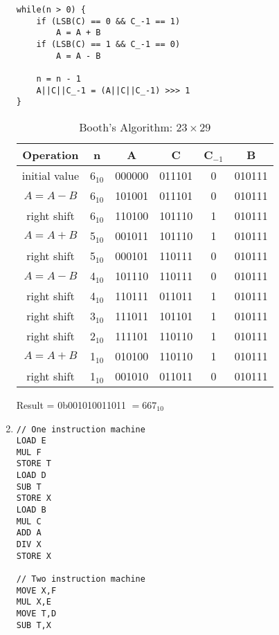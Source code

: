 \documentclass{article}
\begin{document}
\begin{enumerate}
\begin{verbatim}
while(n > 0) {
    if (LSB(C) == 0 && C_-1 == 1)
        A = A + B
    if (LSB(C) == 1 && C_-1 == 0)
        A = A - B
    
    n = n - 1
    A||C||C_-1 = (A||C||C_-1) >>> 1 
}
    \end{verbatim}
    \begin{table}[htbp]
        \centering
        \caption{Booth's Algorithm: \(23 \times 29\)}
        \begin{tabular}{c|c|c|c|c|c}
            \hline
            Operation & n & A & C & C\(_{-1}\) & B \\
            \hline
            initial value & 6\(_{10}\) & 000000 & 011101 & 0 & 010111 \\
            \(A = A - B\) & 6\(_{10}\) & 101001 & 011101 & 0 & 010111 \\
            right shift & 6\(_{10}\) & 110100 & 101110 & 1 & 010111 \\
            \(A = A + B \) & 5\(_{10}\) & 001011 & 101110 & 1 & 010111 \\
            right shift & 5\(_{10}\) & 000101 & 110111 & 0 & 010111 \\
            \(A = A - B\) & 4\(_{10}\) & 101110 & 110111 & 0 & 010111 \\
            right shift & 4\(_{10}\) & 110111 & 011011 & 1 & 010111 \\
            right shift & 3\(_{10}\) & 111011 & 101101 & 1 & 010111 \\
            right shift & 2\(_{10}\) & 111101 & 110110 & 1 & 010111 \\
            \(A = A + B\) & 1\(_{10}\) & 010100 & 110110 & 1 & 010111 \\
            right shift & 1\(_{10}\) & 001010 & 011011 & 0 & 010111 \\
        \end{tabular}
        \newline
        \newline Result = 0b001010011011 \( = 667_{10}\)
    \end{table}

    \pagebreak
    \item 
    \begin{verbatim}
// One instruction machine
LOAD E
MUL F
STORE T
LOAD D
SUB T
STORE X
LOAD B
MUL C
ADD A
DIV X
STORE X

// Two instruction machine
MOVE X,F
MUL X,E
MOVE T,D
SUB T,X


\end{verbatim}
\end{enumerate}
\end{document}
